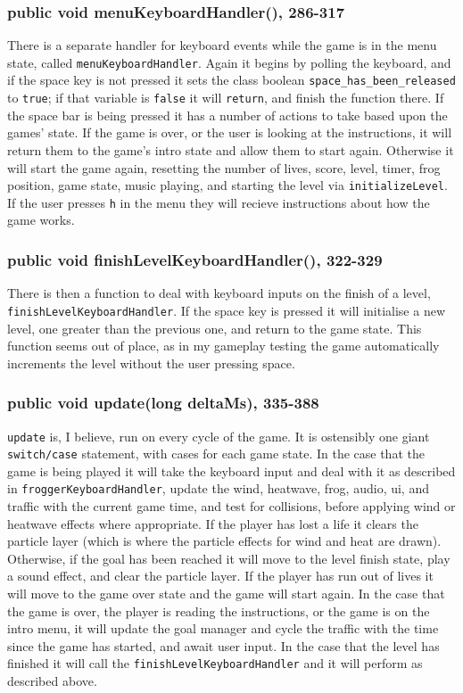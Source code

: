 \documentclass[12pt]{article}
\begin{document}
\subsubsection{public void menuKeyboardHandler(), 286-317}
There is a separate handler for keyboard events while the game is in the menu state, called \verb|menuKeyboardHandler|.
Again it begins by polling the keyboard, and if the space key is not pressed it sets the class boolean \verb|space_has_been_released| to \verb|true|; if that variable is \verb|false| it will \verb|return|, and finish the function there.
If the space bar is being pressed it has a number of actions to take based upon the games' state.
If the game is over, or the user is looking at the instructions, it will return them to the game's intro state and allow them to start again.
Otherwise it will start the game again, resetting the number of lives, score, level, timer, frog position, game state, music playing, and starting the level via \verb|initializeLevel|.
If the user presses \verb|h| in the menu they will recieve instructions about how the game works.

\subsubsection{public void finishLevelKeyboardHandler(), 322-329}
There is then a function to deal with keyboard inputs on the finish of a level, \verb|finishLevelKeyboardHandler|.
If the space key is pressed it will initialise a new level, one greater than the previous one, and return to the game state.
This function seems out of place, as in my gameplay testing the game automatically increments the level without the user pressing space.

\subsubsection{public void update(long deltaMs), 335-388}
\verb|update| is, I believe, run on every cycle of the game.
It is ostensibly one giant \verb|switch/case| statement, with cases for each game state.
In the case that the game is being played it will take the keyboard input and deal with it as described in \verb|froggerKeyboardHandler|, update the wind, heatwave, frog, audio, ui, and traffic with the current game time, and test for collisions, before applying wind or heatwave effects where appropriate.
If the player has lost a life it clears the particle layer (which is where the particle effects for wind and heat are drawn).
Otherwise, if the goal has been reached it will move to the level finish state, play a sound effect, and clear the particle layer.
If the player has run out of lives it will move to the game over state and the game will start again.
In the case that the game is over, the player is reading the instructions, or the game is on the intro menu, it will update the goal manager and cycle the traffic with the time since the game has started, and await user input.
In the case that the level has finished it will call the \verb|finishLevelKeyboardHandler| and it will perform as described above.
\end{document}

